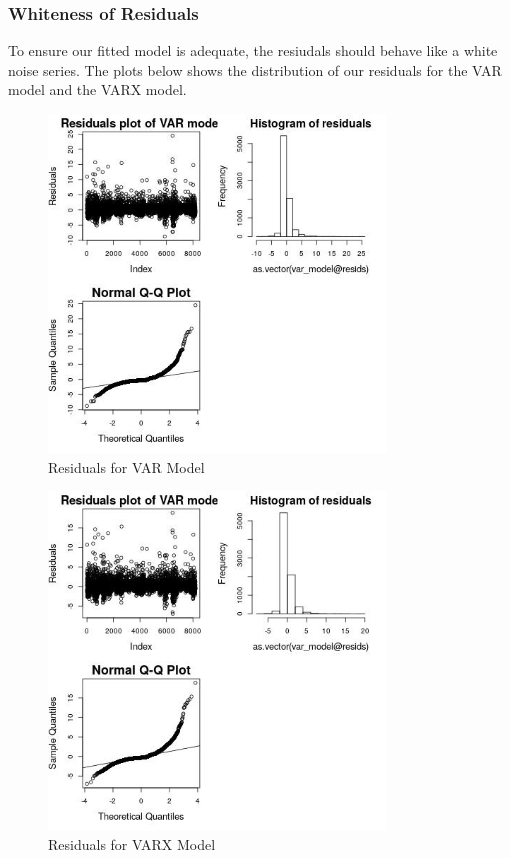 \documentclass[12pt, letterpaper] {article}
\begin{document}
\subsubsection{Whiteness of Residuals}
To ensure our fitted model is adequate, the resiudals should behave like a white noise series. 
The plots below shows the distribution of our residuals for the VAR model and the VARX model. 

\begin{figure}[H]
    \centering
    \includegraphics[width=0.8\textwidth, height=0.42\textheight]{Images/Full_VAR_diff_resids.jpg}
    \caption{Residuals for VAR Model}
    \label{fig:Residuals for VAR Model}
\end{figure}

\begin{figure}[H]
    \centering
    \includegraphics[width=0.8\textwidth, height=0.42\textheight]{Images/Full_VARX_diff_resids.jpg}
    \caption{Residuals for VARX Model}
    \label{fig:Residuals for VARX Model}
\end{figure}
\end{document}
